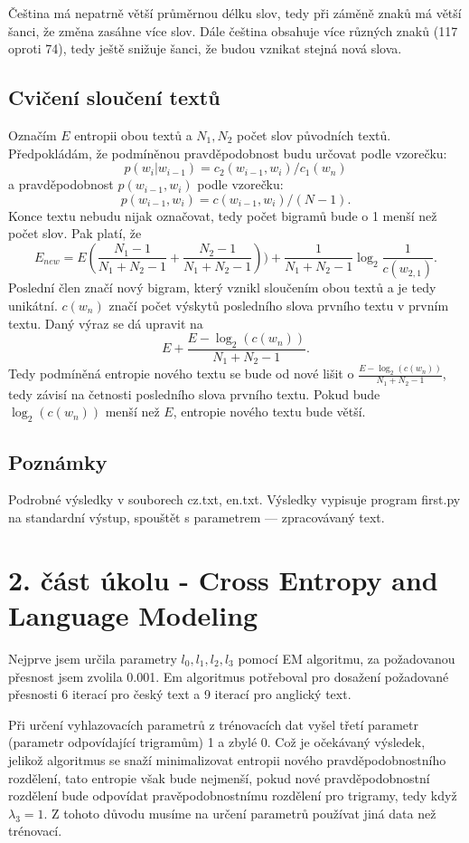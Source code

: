 \documentclass[12pt, a4paper]{report}
\theoremstyle{remark}
\begin{document}
Čeština má nepatrně větší průměrnou délku slov, tedy při záměně znaků má větší šanci, že změna zasáhne více slov. Dále čeština obsahuje více různých znaků (117 oproti 74), tedy ještě snižuje šanci, že budou vznikat stejná nová slova.

\subsection*{Cvičení sloučení textů}
Označím $E$ entropii obou textů a $N_1,N_2$ počet slov původních textů. Předpokládám, že podmíněnou pravděpodobnost budu určovat podle vzorečku: $$p(w_i|w_{i-1})=c_2(w_{i-1},w_i)/c_1(w_{n})$$ a pravděpodobnost $p(w_{i-1},w_{i})$ podle vzorečku: $$p(w_{i-1},w_{i})=c(w_{i-1},w_{i})/(N-1).$$ Konce textu nebudu nijak označovat, tedy počet bigramů bude o 1 menší než počet slov. Pak platí, že 
$$ E_{new}= E(\frac{N_1-1}{N_1+N_2-1}+\frac{N_2-1}{N_1+N_2-1}))+\frac{1}{N_1+N_2-1}\log_2{\frac{1}{c(w_{2,1})}}. $$
Poslední člen značí nový bigram, který vznikl sloučením obou textů a je tedy unikátní. $c(w_n)$ značí počet výskytů posledního slova prvního textu v prvním textu. Daný výraz se dá upravit na
$$ E+\frac{E-\log_2(c(w_{n}))}{N_1+N_2-1}. $$
Tedy podmíněná entropie nového textu se bude od nové lišit o $\frac{E-\log_2(c(w_{n}))}{N_1+N_2-1}$, tedy závisí na četnosti posledního slova prvního textu. Pokud bude $\log_2(c(w_{n}))$ menší než $E$, entropie nového textu bude větší.

\subsection*{Poznámky}
Podrobné výsledky v souborech cz.txt, en.txt.
Výsledky vypisuje program first.py na standardní výstup, spouštět s parametrem --- zpracovávaný text.


\section*{2. část úkolu - Cross Entropy and Language Modeling}

Nejprve jsem určila parametry $l_0, l_1, l_2, l_3$ pomocí EM algoritmu, za požadovanou přesnost jsem zvolila 0.001. Em algoritmus potřeboval pro dosažení požadované přesnosti 6 iterací pro český text a 9 iterací pro anglický text.

Při určení vyhlazovacích parametrů z trénovacích dat vyšel třetí parametr (parametr odpovídající trigramům) 1 a zbylé 0. Což je očekávaný výsledek, jelikož algoritmus se snaží minimalizovat entropii nového pravděpodobnostního rozdělení, tato entropie však bude nejmenší, pokud nové pravděpodobnostní rozdělení bude odpovídat pravěpodobnostnímu rozdělení pro trigramy, tedy když $\lambda_3=1$. Z tohoto důvodu musíme na určení parametrů používat jiná data než trénovací.
\end{document}

